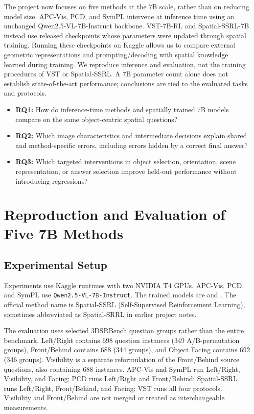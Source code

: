 \documentclass[runningheads]{llncs}
\begin{document}
The project now focuses on five methods at the 7B scale, rather than on reducing model size. APC-Vis, PCD, and SymPL intervene at inference time using an unchanged Qwen2.5-VL-7B-Instruct backbone. VST-7B-RL and Spatial-SSRL-7B instead use released checkpoints whose parameters were updated through spatial training. Running these checkpoints on Kaggle allows us to compare external geometric representations and prompting/decoding with spatial knowledge learned during training. We reproduce inference and evaluation, not the training procedures of VST or Spatial-SSRL. A 7B parameter count alone does not establish state-of-the-art performance; conclusions are tied to the evaluated tasks and protocols.

\begin{itemize}
    \item \textbf{RQ1:} How do inference-time methods and spatially trained 7B models compare on the same object-centric spatial questions?
    \item \textbf{RQ2:} Which image characteristics and intermediate decisions explain shared and method-specific errors, including errors hidden by a correct final answer?
    \item \textbf{RQ3:} Which targeted interventions in object selection, orientation, scene representation, or answer selection improve held-out performance without introducing regressions?
\end{itemize}

\section{Reproduction and Evaluation of Five 7B Methods}

\subsection{Experimental Setup}

Experiments use Kaggle runtimes with two NVIDIA T4 GPUs. APC-Vis, PCD, and SymPL use \texttt{Qwen2.5-VL-7B-Instruct}. The trained models are  and . The official method name is Spatial-SSRL (Self-Supervised Reinforcement Learning), sometimes abbreviated as Spatial-SRRL in earlier project notes.

The evaluation uses selected 3DSRBench question groups rather than the entire benchmark. Left/Right contains 698 question instances (349 A/B-permutation groups), Front/Behind contains 688 (344 groups), and Object Facing contains 692 (346 groups). Visibility is a separate reformulation of the Front/Behind source questions, also containing 688 instances. APC-Vis and SymPL run Left/Right, Visibility, and Facing; PCD runs Left/Right and Front/Behind; Spatial-SSRL runs Left/Right, Front/Behind, and Facing; VST runs all four protocols. Visibility and Front/Behind are not merged or treated as interchangeable measurements.
\end{document}
